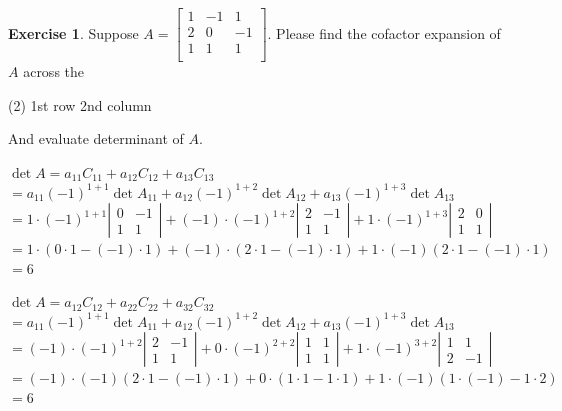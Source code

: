 \documentclass{beamer}
\theoremstyle{definition}
\newtheorem{exercise}[theorem]{Exercise}
\theoremstyle{remark}
\begin{document}
\begin{frame}[t]
\begin{exercise}
Suppose $A=\begin{bmatrix}
1&-1&1\\
2&0&-1\\
1&1&1\\
\end{bmatrix}$. Please find the cofactor expansion of $A$ across the
\begin{tasks}(2)
\task 1st row
\task 2nd column
\end{tasks}
And evaluate determinant of $A$.
\end{exercise}
\pause
\begin{solution}
$\det A=a_{11}C_{11}+a_{12}C_{12}+a_{13}C_{13}$\\\pause
$=a_{11}(-1)^{1+1}\det A_{11}+a_{12}(-1)^{1+2}\det A_{12}+a_{13}(-1)^{1+3}\det A_{13}$\\\pause
$=1\cdot(-1)^{1+1}\left|\begin{matrix}
0&-1\\1&1
\end{matrix}\right|+(-1)\cdot(-1)^{1+2}\left|\begin{matrix}
2&-1\\1&1
\end{matrix}\right|+1\cdot(-1)^{1+3}\left|\begin{matrix}
2&0\\1&1
\end{matrix}\right|$\\\pause
$=1\cdot(0\cdot1-(-1)\cdot1)+(-1)\cdot(2\cdot1-(-1)\cdot1)+1\cdot(-1)(2\cdot1-(-1)\cdot1)$\\
$=6$
\end{solution}
\end{frame}

\begin{frame}[t]
\begin{solution}
$\det A=a_{12}C_{12}+a_{22}C_{22}+a_{32}C_{32}$\\\pause
$=a_{11}(-1)^{1+1}\det A_{11}+a_{12}(-1)^{1+2}\det A_{12}+a_{13}(-1)^{1+3}\det A_{13}$\\\pause
$=(-1)\cdot(-1)^{1+2}\left|\begin{matrix}
2&-1\\1&1
\end{matrix}\right|+0\cdot(-1)^{2+2}\left|\begin{matrix}
1&1\\1&1
\end{matrix}\right|+1\cdot(-1)^{3+2}\left|\begin{matrix}
1&1\\2&-1
\end{matrix}\right|$\\\pause
$=(-1)\cdot(-1)(2\cdot1-(-1)\cdot1)+0\cdot(1\cdot1-1\cdot1)+1\cdot(-1)(1\cdot(-1)-1\cdot2)$\\
$=6$
\end{solution}
\end{frame}
\end{document}
